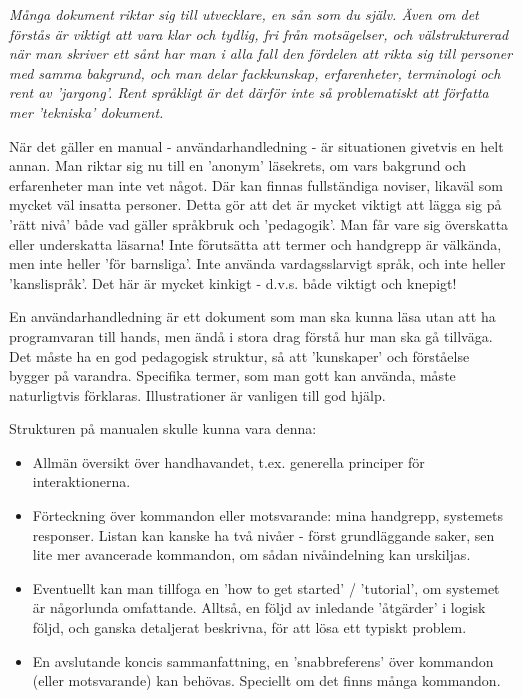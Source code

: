 \em Många dokument riktar sig till utvecklare, en sån som du själv. Även om det förstås är viktigt att vara klar och tydlig, fri från motsägelser, och välstrukturerad när man skriver ett sånt har man i alla fall den fördelen att rikta sig till personer med samma bakgrund, och man delar fackkunskap, erfarenheter, terminologi och rent av 'jargong'. Rent språkligt är det därför inte så problematiskt att författa mer 'tekniska' dokument.

När det gäller en manual - användarhandledning - är situationen givetvis en helt annan. Man riktar sig nu till en 'anonym' läsekrets, om vars bakgrund och erfarenheter man inte vet något. Där kan finnas fullständiga noviser, likaväl som mycket väl insatta personer. Detta gör att det är mycket viktigt att lägga sig på 'rätt nivå' både vad gäller språkbruk och 'pedagogik'. Man får vare sig överskatta eller underskatta läsarna! Inte förutsätta att termer och handgrepp är välkända, men inte heller 'för barnsliga'. Inte använda vardagsslarvigt språk, och inte heller 'kanslispråk'. Det här är mycket kinkigt - d.v.s. både viktigt och knepigt!

En användarhandledning är ett dokument som man ska kunna läsa utan att ha programvaran till hands, men ändå i stora drag förstå hur man ska gå tillväga. Det måste ha en god pedagogisk struktur, så att 'kunskaper' och förståelse bygger på varandra. Specifika termer, som man gott kan använda, måste naturligtvis förklaras. Illustrationer är vanligen till god hjälp.

Strukturen på manualen skulle kunna vara denna:

\begin{itemize}Syftet med programvaran - vilket problem/vilken uppgift understöder den?
\item Allmän översikt över handhavandet, t.ex. generella principer för interaktionerna.
\item Förteckning över kommandon eller motsvarande: mina handgrepp, systemets responser. Listan kan kanske ha två nivåer - först grundläggande saker, sen lite mer avancerade kommandon, om sådan nivåindelning kan urskiljas.
\item Eventuellt kan man tillfoga en 'how to get started' / 'tutorial', om systemet är någorlunda omfattande. Alltså, en följd av inledande 'åtgärder' i logisk följd, och ganska detaljerat beskrivna, för att lösa ett typiskt problem.
\item En avslutande koncis sammanfattning, en 'snabbreferens' över kommandon (eller motsvarande) kan behövas. Speciellt om det finns många kommandon.
\end{itemize}
\em



